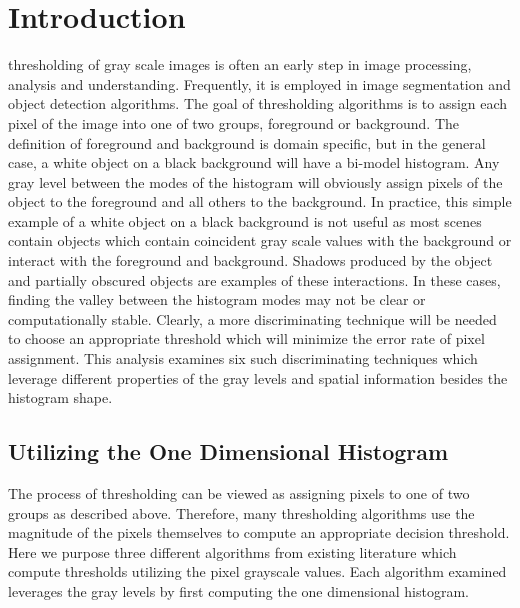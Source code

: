 \documentclass[journal]{IEEEtran}
\begin{document}
\section{Introduction}
 thresholding of gray scale images is often an early step in image processing, analysis and understanding. Frequently, it is employed in image segmentation and object detection algorithms. The goal of thresholding algorithms is to assign each pixel of the image into one of two groups, foreground or background. The definition of foreground and background is domain specific, but in the general case, a white object on a black background will have a bi-model histogram. Any gray level between the modes of the histogram will obviously assign pixels of the object to the foreground and all others to the background. In practice, this simple example of a white object on a black background is not useful as most scenes contain objects which contain coincident gray scale values with the background or interact with the foreground and background. Shadows produced by the object and partially obscured objects are examples of these interactions. In these cases, finding the valley between the histogram modes may not be clear or computationally stable. Clearly, a more discriminating technique will be needed to choose an appropriate threshold which will minimize the error rate of pixel assignment. This analysis examines six such discriminating techniques which leverage different properties of the gray levels and spatial information besides the histogram shape.

\subsection{Utilizing the One Dimensional Histogram}
\par The process of thresholding can be viewed as assigning pixels to one of two groups as described above. Therefore, many thresholding algorithms use the magnitude of the pixels themselves to compute an appropriate decision threshold. Here we purpose three different algorithms from existing literature which compute thresholds utilizing the pixel grayscale values. Each algorithm examined leverages the gray levels by first computing the one dimensional histogram.
\end{document}
